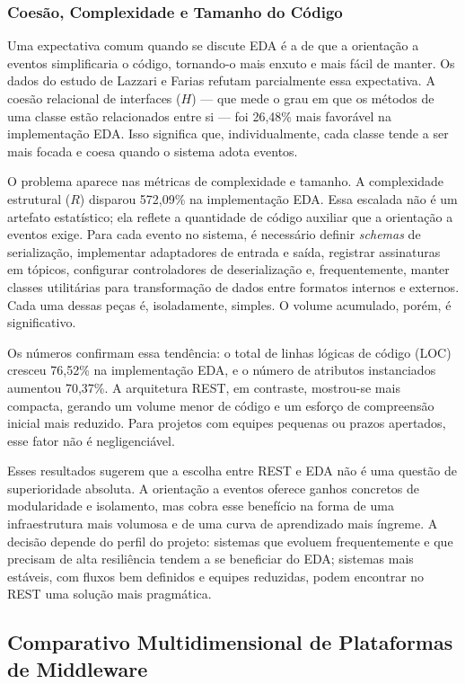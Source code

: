 \documentclass[12pt, a4paper]{article}
\begin{document}
\subsubsection{Coesão, Complexidade e Tamanho do Código}

Uma expectativa comum quando se discute EDA é a de que a orientação a eventos simplificaria o código, tornando-o mais enxuto e mais fácil de manter. Os dados do estudo de Lazzari e Farias refutam parcialmente essa expectativa. A coesão relacional de interfaces ($H$) --- que mede o grau em que os métodos de uma classe estão relacionados entre si --- foi 26,48\% mais favorável na implementação EDA. Isso significa que, individualmente, cada classe tende a ser mais focada e coesa quando o sistema adota eventos.

O problema aparece nas métricas de complexidade e tamanho. A complexidade estrutural ($R$) disparou 572,09\% na implementação EDA. Essa escalada não é um artefato estatístico; ela reflete a quantidade de código auxiliar que a orientação a eventos exige. Para cada evento no sistema, é necessário definir \textit{schemas} de serialização, implementar adaptadores de entrada e saída, registrar assinaturas em tópicos, configurar controladores de deserialização e, frequentemente, manter classes utilitárias para transformação de dados entre formatos internos e externos. Cada uma dessas peças é, isoladamente, simples. O volume acumulado, porém, é significativo.

Os números confirmam essa tendência: o total de linhas lógicas de código (LOC) cresceu 76,52\% na implementação EDA, e o número de atributos instanciados aumentou 70,37\%. A arquitetura REST, em contraste, mostrou-se mais compacta, gerando um volume menor de código e um esforço de compreensão inicial mais reduzido. Para projetos com equipes pequenas ou prazos apertados, esse fator não é negligenciável.

Esses resultados sugerem que a escolha entre REST e EDA não é uma questão de superioridade absoluta. A orientação a eventos oferece ganhos concretos de modularidade e isolamento, mas cobra esse benefício na forma de uma infraestrutura mais volumosa e de uma curva de aprendizado mais íngreme. A decisão depende do perfil do projeto: sistemas que evoluem frequentemente e que precisam de alta resiliência tendem a se beneficiar do EDA; sistemas mais estáveis, com fluxos bem definidos e equipes reduzidas, podem encontrar no REST uma solução mais pragmática.


\subsection{Comparativo Multidimensional de Plataformas de Middleware}
\end{document}
